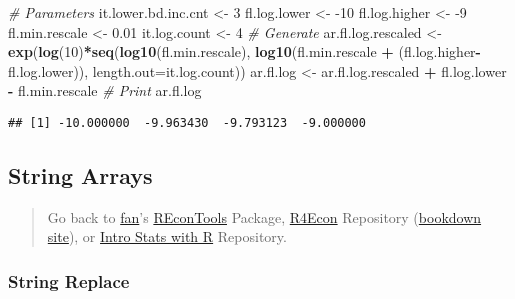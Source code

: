 \documentclass[
]{book}
\newenvironment{Shaded}{\begin{snugshade}}{\end{snugshade}}
\newcommand{\CommentTok}[1]{\textcolor[rgb]{0.56,0.35,0.01}{\textit{#1}}}
\newcommand{\DataTypeTok}[1]{\textcolor[rgb]{0.13,0.29,0.53}{#1}}
\newcommand{\DecValTok}[1]{\textcolor[rgb]{0.00,0.00,0.81}{#1}}
\newcommand{\FloatTok}[1]{\textcolor[rgb]{0.00,0.00,0.81}{#1}}
\newcommand{\KeywordTok}[1]{\textcolor[rgb]{0.13,0.29,0.53}{\textbf{#1}}}
\newcommand{\NormalTok}[1]{#1}
\newcommand{\OperatorTok}[1]{\textcolor[rgb]{0.81,0.36,0.00}{\textbf{#1}}}
\newcommand{\StringTok}[1]{\textcolor[rgb]{0.31,0.60,0.02}{#1}}
\begin{document}
\begin{Shaded}
\begin{Highlighting}[]
\CommentTok{# Parameters}
\NormalTok{it.lower.bd.inc.cnt <-}\StringTok{ }\DecValTok{3}
\NormalTok{fl.log.lower <-}\StringTok{ }\DecValTok{-10}
\NormalTok{fl.log.higher <-}\StringTok{ }\DecValTok{-9}
\NormalTok{fl.min.rescale <-}\StringTok{ }\FloatTok{0.01}
\NormalTok{it.log.count <-}\StringTok{ }\DecValTok{4}
\CommentTok{# Generate}
\NormalTok{ar.fl.log.rescaled <-}\StringTok{ }\KeywordTok{exp}\NormalTok{(}\KeywordTok{log}\NormalTok{(}\DecValTok{10}\NormalTok{)}\OperatorTok{*}\KeywordTok{seq}\NormalTok{(}\KeywordTok{log10}\NormalTok{(fl.min.rescale),}
                                      \KeywordTok{log10}\NormalTok{(fl.min.rescale }\OperatorTok{+}
\StringTok{                                              }\NormalTok{(fl.log.higher}\OperatorTok{-}\NormalTok{fl.log.lower)),}
                                      \DataTypeTok{length.out=}\NormalTok{it.log.count))}
\NormalTok{ar.fl.log <-}\StringTok{ }\NormalTok{ar.fl.log.rescaled }\OperatorTok{+}\StringTok{ }\NormalTok{fl.log.lower }\OperatorTok{-}\StringTok{ }\NormalTok{fl.min.rescale}
\CommentTok{# Print}
\NormalTok{ar.fl.log}
\end{Highlighting}
\end{Shaded}

\begin{verbatim}
## [1] -10.000000  -9.963430  -9.793123  -9.000000
\end{verbatim}

\hypertarget{string-arrays}{%
\subsection{String Arrays}\label{string-arrays}}

\begin{quote}
Go back to \href{http://fanwangecon.github.io/CodeDynaAsset/}{fan}'s \href{https://fanwangecon.github.io/REconTools/}{REconTools} Package, \href{https://fanwangecon.github.io/R4Econ/}{R4Econ} Repository (\href{https://fanwangecon.github.io/R4Econ/bookdown}{bookdown site}), or \href{https://fanwangecon.github.io/Stat4Econ/}{Intro Stats with R} Repository.
\end{quote}

\hypertarget{string-replace}{%
\subsubsection{String Replace}\label{string-replace}}
\end{document}
